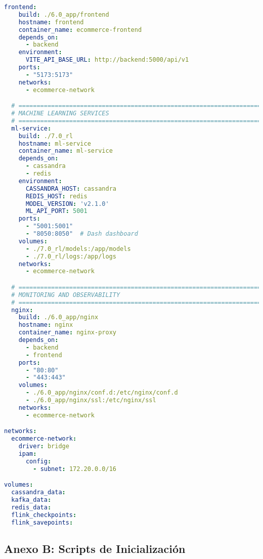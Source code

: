 \begin{lstlisting}[language=yaml, caption=Configuración Docker Compose para Deployment, label=lst:docker_compose]
  frontend:
    build: ./6.0_app/frontend
    hostname: frontend
    container_name: ecommerce-frontend
    depends_on:
      - backend
    environment:
      VITE_API_BASE_URL: http://backend:5000/api/v1
    ports:
      - "5173:5173"
    networks:
      - ecommerce-network

  # ===================================================================
  # MACHINE LEARNING SERVICES
  # ===================================================================
  ml-service:
    build: ./7.0_rl
    hostname: ml-service
    container_name: ml-service
    depends_on:
      - cassandra
      - redis
    environment:
      CASSANDRA_HOST: cassandra
      REDIS_HOST: redis
      MODEL_VERSION: 'v2.1.0'
      ML_API_PORT: 5001
    ports:
      - "5001:5001"
      - "8050:8050"  # Dash dashboard
    volumes:
      - ./7.0_rl/models:/app/models
      - ./7.0_rl/logs:/app/logs
    networks:
      - ecommerce-network

  # ===================================================================
  # MONITORING AND OBSERVABILITY
  # ===================================================================
  nginx:
    build: ./6.0_app/nginx
    hostname: nginx
    container_name: nginx-proxy
    depends_on:
      - backend
      - frontend
    ports:
      - "80:80"
      - "443:443"
    volumes:
      - ./6.0_app/nginx/conf.d:/etc/nginx/conf.d
      - ./6.0_app/nginx/ssl:/etc/nginx/ssl
    networks:
      - ecommerce-network

networks:
  ecommerce-network:
    driver: bridge
    ipam:
      config:
        - subnet: 172.20.0.0/16

volumes:
  cassandra_data:
  kafka_data:
  redis_data:
  flink_checkpoints:
  flink_savepoints:
\end{lstlisting}

\subsection*{Anexo B: Scripts de Inicialización}

